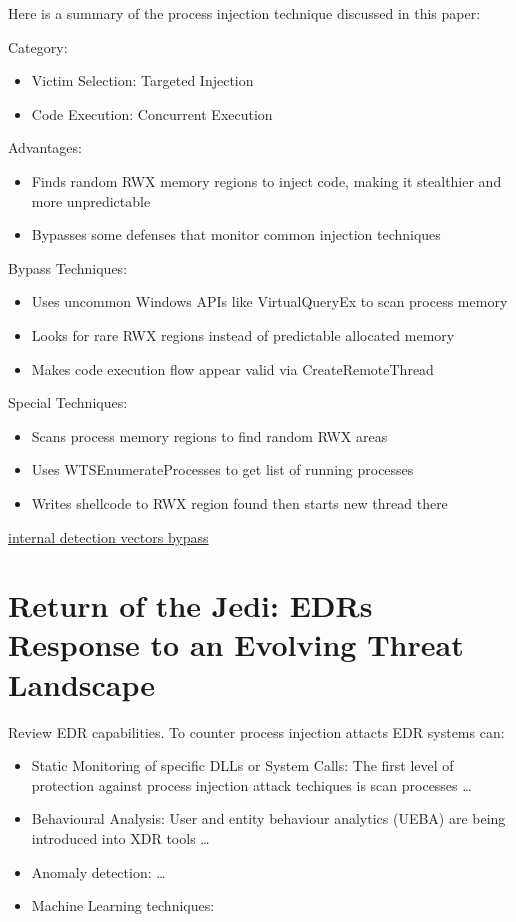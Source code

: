 \documentclass{article}
\begin{document}
Here is a summary of the process injection technique discussed in this paper:

Category:
\begin{itemize}
\item Victim Selection: Targeted Injection
\item Code Execution: Concurrent Execution
\end{itemize}

Advantages:
\begin{itemize}
\item Finds random RWX memory regions to inject code, making it stealthier and more unpredictable
\item Bypasses some defenses that monitor common injection techniques
\end{itemize}

Bypass Techniques:
\begin{itemize}
\item Uses uncommon Windows APIs like VirtualQueryEx to scan process memory
\item Looks for rare RWX regions instead of predictable allocated memory
\item Makes code execution flow appear valid via CreateRemoteThread
\end{itemize}

Special Techniques:
\begin{itemize}
\item Scans process memory regions to find random RWX areas
\item Uses WTSEnumerateProcesses to get list of running processes
\item Writes shellcode to RWX region found then starts new thread there
\end{itemize}


\href{https://www.unknowncheats.me/forum/anti-cheat-bypass/286274-internal-detection-vectors-bypass.html}{internal detection vectors bypass}



\section{Return of the Jedi: EDRs Response to an Evolving Threat Landscape}

Review EDR capabilities.  To counter process injection attacts EDR systems can:

\begin{itemize}
\item Static Monitoring of specific DLLs or System Calls: The first level of protection against process injection attack techiques is
  scan processes \ldots
\item Behavioural Analysis: User and entity behaviour analytics (UEBA) are being introduced into XDR tools \ldots
\item Anomaly detection: \autocite{Pek:2016} \ldots
\item Machine Learning techniques: \autocite{Wang:2022}
\end{itemize}
\end{document}
